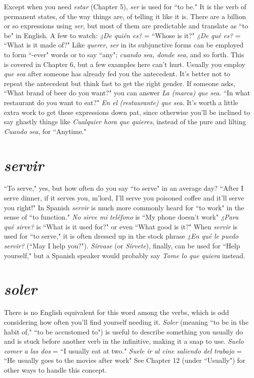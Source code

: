 Except when you need \emph{estar} (Chapter 5), \emph{ser} is used for ``to
be." It is the verb of permanent states, of the way things are, of telling
it like it is. There are a billion or so expressions using \emph{ser}, but most
of them are predictable and translate as ``to be" in English. A few to
watch: \emph{¿De quién es?} = ``Whose is it?" \emph{¿De qué es?} = ``What is it
made of?" Like \emph{querer}, \emph{ser} in its subjunctive forms can be employed
to form ``-ever" words or to say ``any"; \emph{cuando sea, donde sea}, and so
forth. This is covered in Chapter 6, but a few examples here can't hurt.
Usually you employ \emph{que sea} after someone has already fed you the antecedent. It's better not to repeat the antecedent but think fast to get
the right gender. If someone asks, ``What brand of beer do you want?"
you can answer \emph{La (marca) que sea}. ``In what restaurant do you want
to eat?" \emph{En el (restaurante) que sea}. It's worth a little extra work to get
these expressions down pat, since otherwise you'll be inclined to say
ghastly things like \emph{Cualquier hora que quieres}, instead of the pure and
lilting \emph{Cuando sea}, for ``Anytime."

\section{\emph{servir}}

``To serve," yes, but how often do you say ``to serve" in an average day? ``After I serve dinner, if it serves you, m'lord, I'll serve you
poisoned coffee and it'll serve you right!" In Spanish \emph{servir} is much
more commonly heard for ``to work" in the sense of ``to function."
\emph{No sirve mi teléfono} is ``My phone doesn't work" \emph{¿Para qué sirve?} is
``What is it used for?" or even ``What good is it?" When \emph{servir} is used
for ``to serve," it is often dressed up in the stock phrase \emph{¿En qué le
	puedo servir?} (``May I help you?"). \emph{Sírvase} (or \emph{Sírvete}), finally, can be
used for ``Help yourself," but a Spanish speaker would probably say
\emph{Tome lo que quiera} instead.

\section{\emph{soler}}

There is no English equivalent for this word among the verbs,
which is odd considering how often you'll find yourself needing it. \emph{Soler} (meaning ``to be in the habit of," ``to be accustomed to") is useful to
describe something you usually do and is stuck before another verb
in the infinitive, making it a snap to use. \emph{Suelo comer a las dos} = ``I
usually eat at two." \emph{Suele ir al cine saliendo del trabajo} = ``He usually goes to the movies after work" See Chapter 12 (under ``Usually")
for other ways to handle this concept.

